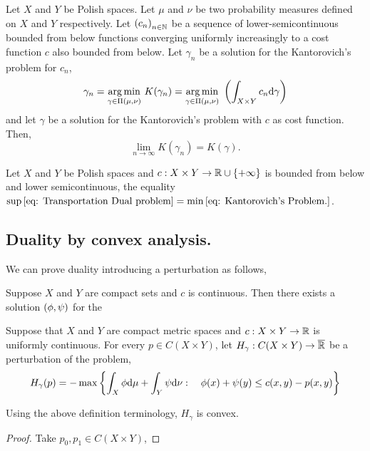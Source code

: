 \begin{lemma}[Stability]
	Let $X$ and $Y$ be Polish spaces. Let $\mu$ and $\nu$ be two probability measures defined on $X$ and $Y$ respectively. Let $\left( c_n \right)_{n\in \mathbb{N}}$ be a sequence of lower-semicontinuous bounded from below functions converging uniformly increasingly to a cost function $c$ also bounded from below. Let $\gamma_n$ be a solution for the Kantorovich's problem for $c_n$,
	\begin{equation*}
		\gamma_n=\displaystyle {\underset {\gamma\in \Pi(\mu, \nu)}{\operatorname {arg\,min} }}\ K(\gamma_n)=\displaystyle {\underset {\gamma\in \Pi(\mu, \nu)}{\operatorname {arg\,min} }}\  \left( \int_{X\times Y}c_n\mathrm{d}\gamma \right)
	\end{equation*}
	and let $\gamma$ be a solution for the Kantorovich's problem with $c$ as cost function. Then,
	\begin{equation*}
		\lim_{n\rightarrow \infty}K(\gamma_n)=K(\gamma).
	\end{equation*}
\end{lemma}

\begin{theorem}
	Let $X$ and $Y$ be Polish spaces and $c:X\times Y\rightarrow \mathbb{R} \cup\left\lbrace +\infty \right\rbrace$ is bounded from below and lower semicontinuous, the equality $\sup\eqref{eq: Transportation Dual problem}=\min\eqref{eq: Kantorovich's Problem.}$.
\end{theorem}	
\subsection{Duality by convex analysis.}
We can prove duality introducing a perturbation as follows, 
\begin{proposition}
	Suppose $X$ and $Y$ are compact sets and $c$ is continuous. Then there exists a solution $\left( \phi, \psi \right)$ for the 
\end{proposition}
\begin{definition}
	Suppose that $X$ and $Y$ are compact metric spaces and $c:X\times Y\rightarrow \mathbb{R}$ is uniformly continuous. For every $p\in C(X\times Y)$, let $H_\gamma:C(X\times Y)\rightarrow \overline{\mathbb{R}}$ be a perturbation of the problem,
	\begin{equation}
	H_\gamma(p)=-\max\left\lbrace \int_X\phi \mathrm{d}\mu + \int_Y\psi \mathrm{d}\nu: \quad \phi(x)+\psi(y)\leq c(x,y)-p(x,y) \right\rbrace
	\end{equation}	
\end{definition}

\begin{lemma}
	Using the above definition terminology, $H_\gamma$ is convex.
\end{lemma}
\begin{proof}
	Take $p_0, p_1 \in C(X\times Y)$,  
\end{proof}

